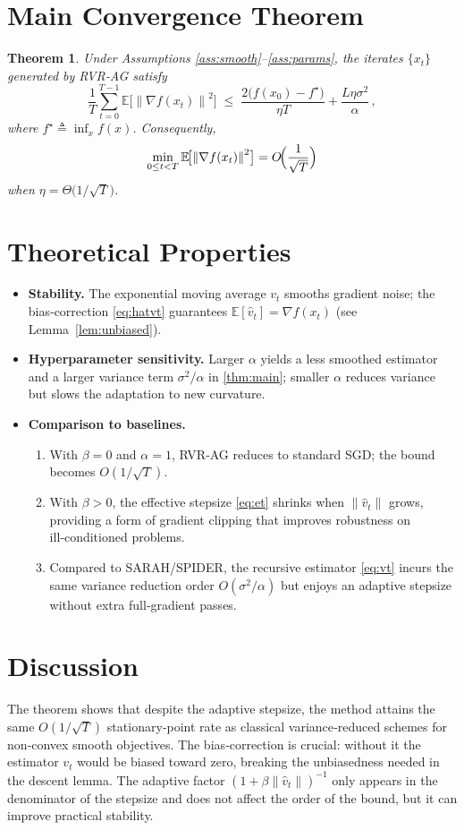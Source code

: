 \documentclass{article}
\newtheorem{theorem}{Theorem}
\newcommand{\E}{\mathbb{E}}
\newcommand{\norm}[1]{\left\|#1\right\|}
\newcommand{\grad}{\nabla}
\begin{document}
\section*{Main Convergence Theorem}
\begin{theorem}\label{thm:main}
Under Assumptions \ref{ass:smooth}--\ref{ass:params}, the iterates $\{x_t\}$ generated by RVR‑AG satisfy
\[
    \frac{1}{T}\sum_{t=0}^{T-1}\E\!\bigl[\norm{\grad f(x_t)}^2\bigr]
    \;\le\;
    \frac{2\bigl(f(x_0)-f^\star\bigr)}{\eta T}
    +\frac{L\eta\sigma^2}{\alpha}\,,
\]
where $f^\star\triangleq\inf_x f(x)$. Consequently,
\[
    \min_{0\le t<T}\E\!\bigl[\norm{\grad f(x_t)}^2\bigr]=O\!\Bigl(\frac{1}{\sqrt{T}}\Bigr)
\]
when $\eta=\Theta\bigl(1/\sqrt{T}\bigr)$.
\end{theorem}

\section*{Theoretical Properties}
\begin{itemize}
    \item \textbf{Stability.} The exponential moving average $v_t$ smooths gradient noise; the bias‑correction \eqref{eq:hatvt} guarantees $\E[\hat v_t]=\grad f(x_t)$ (see Lemma~\ref{lem:unbiased}).
    \item \textbf{Hyperparameter sensitivity.} Larger $\alpha$ yields a less smoothed estimator and a larger variance term $\sigma^2/\alpha$ in \eqref{thm:main}; smaller $\alpha$ reduces variance but slows the adaptation to new curvature.
    \item \textbf{Comparison to baselines.}
        \begin{enumerate}[label=\alph*)]
            \item With $\beta=0$ and $\alpha=1$, RVR‑AG reduces to standard SGD; the bound becomes $O(1/\sqrt{T})$.
            \item With $\beta>0$, the effective stepsize \eqref{eq:et} shrinks when $\norm{\hat v_t}$ grows, providing a form of gradient clipping that improves robustness on ill‑conditioned problems.
            \item Compared to SARAH/SPIDER, the recursive estimator \eqref{eq:vt} incurs the same variance reduction order $O(\sigma^2/\alpha)$ but enjoys an adaptive stepsize without extra full‑gradient passes.
        \end{enumerate}
\end{itemize}

\section*{Discussion}
The theorem shows that despite the adaptive stepsize, the method attains the same $O(1/\sqrt{T})$ stationary‑point rate as classical variance‑reduced schemes for non‑convex smooth objectives. The bias‑correction is crucial: without it the estimator $v_t$ would be biased toward zero, breaking the unbiasedness needed in the descent lemma. The adaptive factor $(1+\beta\norm{\hat v_t})^{-1}$ only appears in the denominator of the stepsize and does not affect the order of the bound, but it can improve practical stability.
\end{document}
